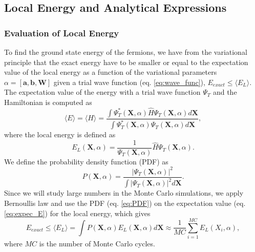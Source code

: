 \documentclass[12pt,a4paper,english]{article}
\begin{document}
\subsection{Local Energy and Analytical Expressions}
\label{subsect:E_L}
\subsubsection{Evaluation of Local Energy}
\label{subsubsect:eval E_L}
To find the ground state energy of the fermions, we have from the variational principle that the exact energy have to be smaller or equal to the expectation value of the local energy as a function of the variational parameters $\alpha=[\textbf{a}, \textbf{b}, \textbf{W}]$ given a trial wave function (eq. \ref{eq:wave_func}), $E_{exact}\leq \langle E_L \rangle$. The expectation value of the energy with a trial wave function $\Psi_T$ and the Hamiltonian is computed as
\begin{equation}
\label{eq:expec_E}
\langle E\rangle=\langle H\rangle=\frac{\int \Psi_T^*(\textbf{X}, \alpha)\hat{H}\Psi_T(\textbf{X}, \alpha)d\textbf{X}}
{\int\Psi_T^*(\textbf{X}, \alpha)\Psi_T(\textbf{X}, \alpha)d\textbf{X}},
\end{equation}
where the local energy is defined as 
\begin{equation}
\label{eq:def_EL}
E_L(\textbf{X}, \alpha)=\frac{1}{\Psi_T(\textbf{X}, \alpha)}\hat{H}\Psi_T(\textbf{X}, \alpha).
\end{equation}
We define the probability density function (PDF) as
\begin{equation}
\label{eq:PDF}
P(\textbf{X}, \alpha)=\frac{|\Psi_T(\textbf{X}, \alpha)|^2}{\int|\Psi_T(\textbf{X}, \alpha)|^2d\textbf{X}}.
\end{equation}
Since we will study large numbers in the Monte Carlo simulations, we apply Bernoullis law and use the PDF (eq. \ref{eq:PDF}) on the expectation value (eq. \ref{eq:expec_E}) for the local energy, which gives
\begin{equation}
\label{eq:expect_EL}
E_{exact}\leq\langle E_L \rangle=\int P(\textbf{X}, \alpha)E_L(\textbf{X}, \alpha)d\textbf{X}\approx \frac{1}{MC}\sum_{i=1}^{MC}E_L(X_i, \alpha),
\end{equation}
where $MC$ is the number of Monte Carlo cycles.
\end{document}
